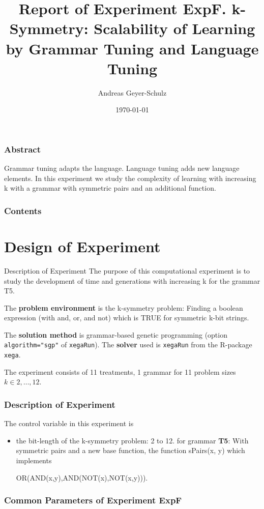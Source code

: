 \documentclass[18pt,c]{beamer}
\begin{document}
\title{Report of Experiment ExpF. k-Symmetry: Scalability of Learning by Grammar Tuning and Language Tuning  }
\author{Andreas Geyer-Schulz}
\date{\today}
\begin{frame}
\titlepage
\end{frame}
\begin{frame}
\frametitle{Abstract}
Grammar tuning adapts the language. Language tuning adds new language elements. In this experiment we study the complexity of learning  with increasing k with a grammar with symmetric pairs and an additional function.%
\end{frame}
\begin{frame}[t, allowframebreaks]
\frametitle{Contents}
\tableofcontents[subsubsectionstyle=hide]
\vfill
\end{frame}
\clearpage
\section{Design of Experiment}
\begin{frame}
\vspace*{2mm}
\begin{block}{
Description of Experiment
}
The purpose of this computational experiment is to study
the development of time and generations with increasing k
for the grammar T5.
 
The {\bf problem environment} is the k-symmetry problem: 
Finding a boolean expression (with and, or, and not)
which is TRUE for symmetric k-bit strings.
 
The {\bf solution method} is grammar-based genetic programming
(option {\tt algorithm="sgp"}  of {\tt xegaRun}).
The {\bf solver} used is {\tt xegaRun} from the R-package {\tt xega}.
 
The experiment consists of 11 treatments, 1 grammar for 11 problem sizes $k\in 2,\dots, 12$.
\end{block}
\end{frame}%
\begin{frame}
\frametitle{
Description of Experiment
}
The control variable in this experiment is
\begin{itemize}
\item the bit-length of the k-symmetry problem: 2 to 12.
       for grammar
       {\bf T5}: With symmetric pairs and a new base function,
       the function sPairs(x, y) which implements
 
 OR(AND(x,y),AND(NOT(x),NOT(x,y))).
\end{itemize}
\end{frame}%
 \begin{frame}
 \fontsize{8pt}{9pt}\selectfont
 \frametitle{ Common Parameters of Experiment ExpF }

 \label{ExpFCommonTable000.tex}  
 \end{frame}
\end{document}
